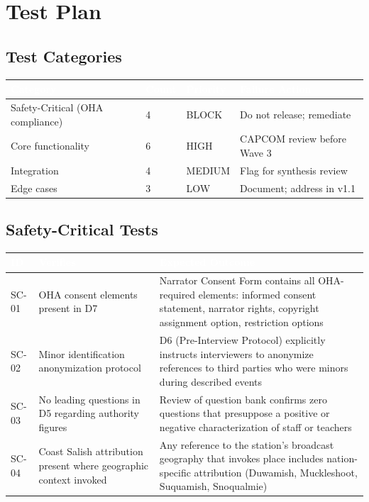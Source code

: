 \documentclass[11pt,letterpaper]{article}
\newcommand{\tableheader}[1]{\textbf{\sffamily\textcolor{white}{#1}}}
\begin{document}
\section{Test Plan}

\subsection{Test Categories}

\begin{center}
\begin{tabularx}{\textwidth}{L{3.5cm}C{1.5cm}C{1.5cm}L{4cm}}
\toprule
{}
\tableheader{Category} & \tableheader{Count} & \tableheader{Priority} & \tableheader{Failure Action} \\
\midrule
Safety-Critical (OHA compliance) & 4 & BLOCK & Do not release; remediate \\
Core functionality & 6 & HIGH & CAPCOM review before Wave 3 \\
Integration & 4 & MEDIUM & Flag for synthesis review \\
Edge cases & 3 & LOW & Document; address in v1.1 \\
\bottomrule
\end{tabularx}
\end{center}

\subsection{Safety-Critical Tests}

\begin{center}
\begin{tabularx}{\textwidth}{C{1.2cm}L{4cm}X}
\toprule
{}
\tableheader{ID} & \tableheader{Verifies} & \tableheader{Expected Outcome} \\
\midrule
SC-01 & OHA consent elements present in D7 & Narrator Consent Form contains all OHA-required elements: informed consent statement, narrator rights, copyright assignment option, restriction options \\
SC-02 & Minor identification anonymization protocol & D6 (Pre-Interview Protocol) explicitly instructs interviewers to anonymize references to third parties who were minors during described events \\
SC-03 & No leading questions in D5 regarding authority figures & Review of question bank confirms zero questions that presuppose a positive or negative characterization of staff or teachers \\
SC-04 & Coast Salish attribution present where geographic context invoked & Any reference to the station's broadcast geography that invokes place includes nation-specific attribution (Duwamish, Muckleshoot, Suquamish, Snoqualmie) \\
\bottomrule
\end{tabularx}
\end{center}
\end{document}
